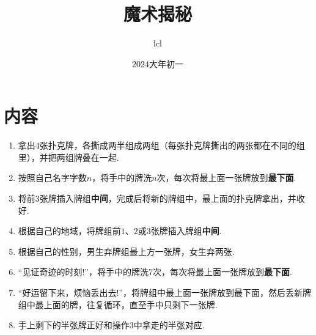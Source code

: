 \documentclass[10pt]{article}
\title{魔术揭秘}
\author{lcl}
\date{2024大年初一}
\begin{document}
\maketitle
\section*{内容}
\begin{enumerate}
    \item 拿出$4$张扑克牌，各撕成两半组成两组（每张扑克牌撕出的两张都在不同的组里），并把两组牌叠在一起.
    \item 按照自己名字字数$n$，将手中的牌洗$n$次，每次将最上面一张牌放到\textbf{最下面}.
    \item 将前$3$张牌插入牌组\textbf{中间}，完成后将新的牌组中，最上面的扑克牌拿出，并收好.
    \item 根据自己的地域，将牌组前$1$、$2$或$3$张牌插入牌组\textbf{中间}.
    \item 根据自己的性别，男生弃牌组最上方一张牌，女生弃两张.
    \item ``见证奇迹的时刻!''，将手中的牌洗$7$次，每次将最上面一张牌放到\textbf{最下面}.
    \item ``好运留下来，烦恼丢出去!''，将牌组中最上面一张牌放到最下面，然后丢新牌组中最上面的牌，往复循环，直至手中只剩下一张牌.
    \item 手上剩下的半张牌正好和操作3中拿走的半张对应.
\end{enumerate}
\end{document}
